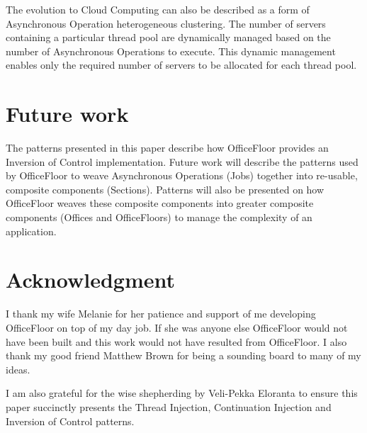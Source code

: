 \documentclass[prodmode]{style/acmlarge}
\begin{document}
The evolution to Cloud Computing can also be described as a form of Asynchronous
Operation heterogeneous clustering.  The number of servers containing a
particular thread pool are dynamically managed based on the number of
Asynchronous Operations to execute.  This dynamic management enables only the
required number of servers to be allocated for each thread pool.



\section{Future work}

The patterns presented in this paper describe how OfficeFloor \cite{officefloor}
provides an Inversion of Control implementation.  Future work will describe the
patterns used by OfficeFloor to weave Asynchronous Operations (Jobs) together
into re-usable, composite components (Sections).  Patterns will also be
presented on how OfficeFloor weaves these composite components into greater
composite components (Offices and OfficeFloors) to manage the complexity of an
application.



\section*{Acknowledgment} I thank my wife Melanie for her patience and support
of me developing OfficeFloor on top of my day job.  If she was anyone else
OfficeFloor would not have been built and this work would not have resulted from
OfficeFloor.  I also thank my good friend Matthew Brown for being a sounding
board to many of my ideas.

I am also grateful for the wise shepherding by Veli-Pekka Eloranta to ensure
this paper succinctly presents the Thread Injection, Continuation Injection and
Inversion of Control patterns.




\end{document}
